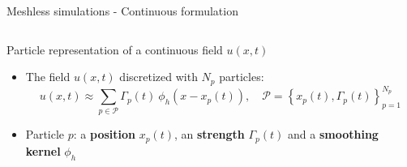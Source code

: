 \documentclass[aspectratio=169]{beamer} %
\begin{document}
\begin{frame}{Meshless simulations - Continuous formulation}
    \begin{columns}[t]
        \begin{column}{0.7\textwidth}
            \begin{Definition}
                Particle representation of a continuous field $u(x,t)$\\
            \end{Definition}
            \begin{itemize}
                \item The field $u(x, t)$ discretized with $N_p$ particles:
                      \begin{equation*}
                          u(x, t) \approx \sum_{p \in \mathcal P} \Gamma_p(t)~\phi_h(x - x_p(t)), \quad \mathcal P = \left\{x_p(t), \Gamma_p(t)\right\}_{p=1}^{N_p}
                      \end{equation*}
                \item Particle $p$: a \textbf{position} $x_p(t)$, an \textbf{strength} $\Gamma_p(t)$ and a \textbf{smoothing kernel} $\phi_h$


\end{itemize}
\end{column}
\end{columns}
\end{frame}
\end{document}
